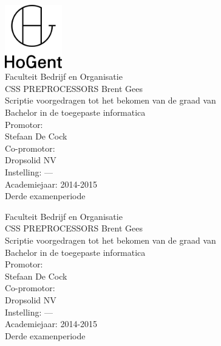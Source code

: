 \documentclass[pdftex,a4paper,12pt,twoside]{report}
\newcommand{\emptypage}{
\newpage
\thispagestyle{empty}
\mbox{}
\newpage
}
\newcommand{\student}{Brent Gees}
\newcommand{\promotor}{Stefaan De Cock}
\newcommand{\copromotor}{Dropsolid NV}
\newcommand{\instelling}{---}
\newcommand{\titel}{CSS PREPROCESSORS}
\newcommand{\faculteit}{Faculteit Bedrijf en Organisatie}
\newcommand{\rapporttype}{Scriptie voorgedragen tot het bekomen van de graad van\\Bachelor in de toegepaste informatica}
\newcommand{\academiejaar}{2014-2015}
\newcommand{\examenperiode}{Derde examenperiode}
\begin{document}

\begin{titlepage}
  \begin{center}

    \begingroup
    \rmfamily
    \includegraphics[width=2.5cm]{img/HG-beeldmerk-woordmerk}\\[.5cm]
    \faculteit\\[3cm]
    \titel
    \vfill
    \student\\[3.5cm]
    \rapporttype\\[2cm]
    Promotor:\\
    \promotor\\
    Co-promotor:\\
    \copromotor\\[2.5cm]
    Instelling: \instelling\\[.5cm]
    Academiejaar: \academiejaar\\[.5cm]
    \examenperiode
    \endgroup

  \end{center}
  \restoregeometry
\end{titlepage}


\emptypage


\begin{titlepage}
  \begin{center}

    \begingroup
    \rmfamily
    \faculteit\\[3cm]
    \titel
    \vfill
    \student\\[3.5cm]
    \rapporttype\\[2cm]
    Promotor:\\
    \promotor\\
    Co-promotor:\\
    \copromotor\\[2.5cm]
    Instelling: \instelling\\[.5cm]
    Academiejaar: \academiejaar\\[.5cm]
    \examenperiode
    \endgroup

  \end{center}
  \restoregeometry
\end{titlepage}
\end{document}
